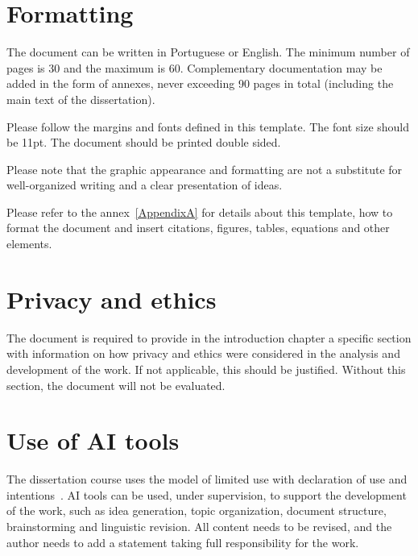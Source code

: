 \section{Formatting}

The document can be written in Portuguese or English. The minimum number of pages is 30 and the maximum is 60. Complementary documentation may be added in the form of annexes, never exceeding 90 pages in total (including the main text of the dissertation).

Please follow the margins and fonts  defined in this template. The font size should be 11pt. The document should be printed double sided.

Please note that the graphic appearance and formatting are not a substitute for well-organized writing and a clear presentation of ideas.

Please refer to the annex~\ref{AppendixA} for details about this template, how to format the document and insert citations, figures, tables, equations and other elements.


\section{Privacy and ethics}
The document is required to provide in the introduction chapter a specific section with information on how privacy and ethics were considered in the analysis and development of the work. If not applicable, this should be justified.  Without this section, the document will not be evaluated.


\section{Use of AI tools}
The dissertation course uses the model of limited use with declaration of use and intentions~\parencite{oliveira2025}. AI tools can be used, under supervision, to support the development of the work, such as idea generation, topic organization, document structure, brainstorming and linguistic revision. All content needs to be revised, and the author needs to add a statement taking full responsibility for the work.

